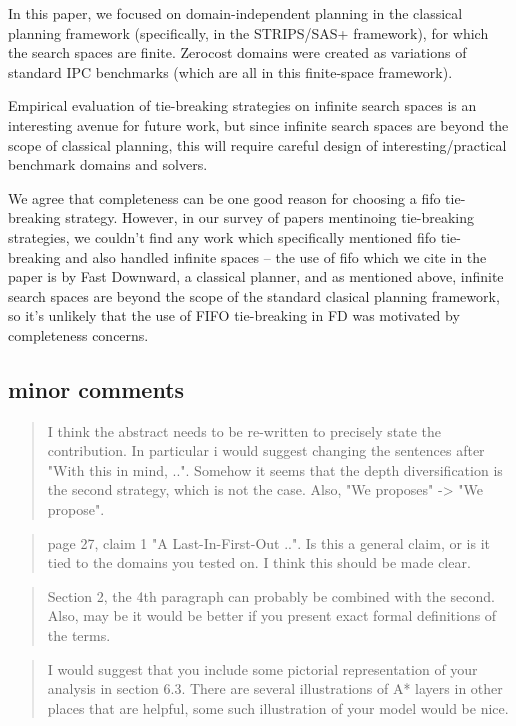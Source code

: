 \documentclass{article}
\begin{document}
In this paper, we focused on domain-independent planning in the classical planning framework (specifically, in the STRIPS/SAS+ framework), for which the search spaces are finite.
Zerocost domains were created as variations of standard IPC benchmarks (which are all in this finite-space framework).

Empirical evaluation of tie-breaking strategies on infinite search
spaces is an interesting avenue for future work, but 
since infinite search spaces are beyond the scope of classical planning, this will require
careful design of interesting/practical benchmark domains and solvers.

We agree that completeness can be one good reason for choosing a  fifo tie-breaking strategy.
However, in our survey of papers mentinoing tie-breaking strategies, we couldn't find any work 
which specifically mentioned fifo tie-breaking and also handled infinite spaces -- 
the use of fifo which we cite in the paper is by Fast Downward, a classical planner, and as mentioned above, 
infinite search spaces are beyond the scope of the standard clasical planning framework, so it's unlikely that the use of FIFO
tie-breaking in FD was motivated by completeness concerns.


\subsection{minor comments}
\label{sec:orgheadline24}

\begin{quote}
 I think the abstract needs to be re-written to precisely state the
contribution. In particular i would suggest changing the sentences
after "With this in mind, ..". Somehow it seems that the depth
diversification is the second strategy, which is not the case. Also,
"We proposes" -> "We propose".
\end{quote}


\begin{quote}
 page 27, claim 1 "A Last-In-First-Out ..". Is this a general claim,
or is it tied to the domains you tested on. I think this should be
made clear.
\end{quote}


\begin{quote}
 Section 2, the 4th paragraph can probably be combined with the
second. Also, may be it would be better if you present exact formal
definitions of the terms.
\end{quote}

\begin{quote}
 I would suggest that you include some pictorial representation of
your analysis in section 6.3. There are several illustrations of A*
layers in other places that are helpful, some such illustration of
your model would be nice.
\end{quote}
\end{document}
